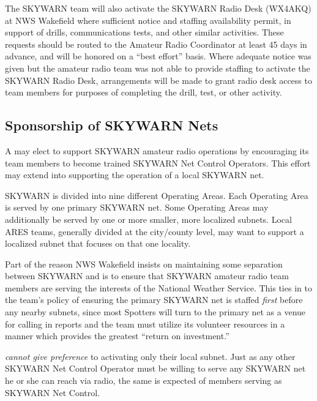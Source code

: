 \documentclass[pdflatex,letterpaper,twoside,12pt]{book}
\begin{document}
The SKYWARN team will also activate the SKYWARN Radio Desk (WX4AKQ) at NWS Wakefield where sufficient notice and staffing availability permit, in support of \tpteam drills, communications tests, and other similar activities.  These requests should be routed to the Amateur Radio Coordinator at least 45 days in advance, and will be honored on a ``best effort'' basis.  Where adequate notice was given but the amateur radio team was not able to provide staffing to activate the SKYWARN Radio Desk, arrangements will be made to grant radio desk access to \tpteam team members for purposes of completing the drill, test, or other activity.


\subsection{\tpteam Sponsorship of SKYWARN Nets}\label{sponsorship-of-nets}

A \tpteam may elect to support SKYWARN amateur radio operations by encouraging its team members to become trained SKYWARN Net Control Operators.  This effort may extend into supporting the operation of a local SKYWARN net.

SKYWARN is divided into nine different Operating Areas.  Each Operating Area is served by one primary SKYWARN net.  Some Operating Areas may additionally be served by one or more smaller, more localized subnets.  Local ARES teams, generally divided at the city/county level, may want to support a localized subnet that focuses on that one locality.

Part of the reason NWS Wakefield insists on maintaining some separation between SKYWARN and \tpteams is to ensure that SKYWARN amateur radio team members are serving the interests of the National Weather Service.  This ties in to the team's policy of ensuring the primary SKYWARN net is staffed \emph{first} before any nearby subnets, since most Spotters will turn to the primary net as a venue for calling in reports and the team must utilize its volunteer resources in a manner which provides the greatest ``return on investment.''

\tpteams \emph{cannot give preference} to activating only their local subnet.  Just as any other SKYWARN Net Control Operator must be willing to serve any SKYWARN net he or she can reach via radio, the same is expected of \tpteam members serving as SKYWARN Net Control.
\end{document}
